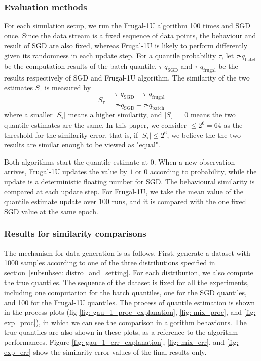 \subsubsection{Evaluation methods}

For each simulation setup, we run the Frugal-1U algorithm 100 times and SGD once. Since the data stream is a fixed sequence of data points, the behaviour and result of SGD are also fixed, whereas Frugal-1U is likely to perform differently given its randomness in each update step. For a quantile probability $\tau$, let $\tau$-$q_{\text{batch}}$ be the computation results of the batch quantile, $\tau$-$q_{\text{SGD}}$ and $\tau$-$q_{\text{frugal}}$ be the results respectively of SGD and Frugal-1U algorithm. The similarity of the two estimates $S_\tau$ is measured by
\begin{equation}
    S_\tau = \frac{ \tau\text{-}q_{\text{SGD}} - \tau\text{-}q_{\text{frugal}} }{ \tau\text{-}q_{\text{SGD}} - \tau\text{-}q_{\text{batch}} }
    \label{eq: frugal_err}
\end{equation}
where a smaller $|S_\tau|$ means a higher similarity, and $|S_\tau| = 0$ means the two quantile estimates are the same. In this paper, we consider $\leq 2^6 = 64$ as the threshold for the similarity error, that is, if $|S_\tau| \leq 2^6$, we believe the the two results are similar enough to be viewed as "equal".

Both algorithms start the quantile estimate at $0$. When a new observation arrives, Frugal-1U updates the value by $1$ or $0$ according to probability, while the update is a deterministic floating number for SGD. The behavioural similarity is compared at each update step. For Frugal-1U, we take the mean value of the quantile estimate update over 100 runs, and it is compared with the one fixed SGD value at the same epoch. 

\subsubsection{Results for similarity comparisons}

The mechanism for data generation is as follows. First, generate a dataset with 1000 samples according to one of the three distributions specified in section~\ref{subsubsec: distro_and_setting}. For each distribution, we also compute the true quantiles. The sequence of the dataset is fixed for all the experiments, including one computation for the batch quantiles, one for the SGD quantiles, and 100 for the Frugal-1U quantiles. The process of quantile estimation is shown in the process plots (fig \ref{fig: gau_1_proc_explanation}, \ref{fig: mix_proc}, and \ref{fig: exp_proc}), in which we can see the comparison in algorithm behaviours. The true quantiles are also shown in these plots, as a reference to the algorithm performances.
Figure \ref{fig: gau_1_err_explanation}, \ref{fig: mix_err}, and \ref{fig: exp_err} show the similarity error values of the final results only.

